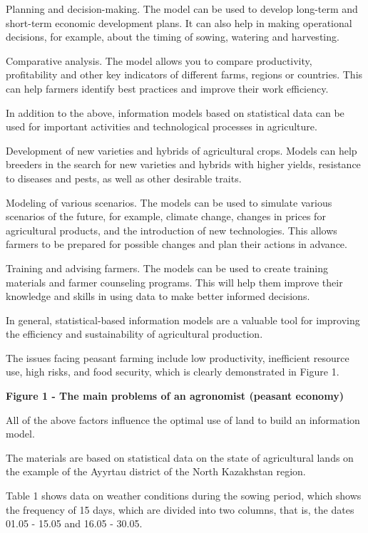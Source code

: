 Planning and decision-making. The model can be used to develop long-term
and short-term economic development plans. It can also help in making
operational decisions, for example, about the timing of sowing, watering
and harvesting.

Comparative analysis. The model allows you to compare productivity,
profitability and other key indicators of different farms, regions or
countries. This can help farmers identify best practices and improve
their work efficiency.

In addition to the above, information models based on statistical data
can be used for important activities and technological processes in
agriculture.

Development of new varieties and hybrids of agricultural crops. Models
can help breeders in the search for new varieties and hybrids with
higher yields, resistance to diseases and pests, as well as other
desirable traits.

Modeling of various scenarios. The models can be used to simulate
various scenarios of the future, for example, climate change, changes in
prices for agricultural products, and the introduction of new
technologies. This allows farmers to be prepared for possible changes
and plan their actions in advance.

Training and advising farmers. The models can be used to create training
materials and farmer counseling programs. This will help them improve
their knowledge and skills in using data to make better informed
decisions.

In general, statistical-based information models are a valuable tool for
improving the efficiency and sustainability of agricultural production.

The issues facing peasant farming include low productivity, inefficient
resource use, high risks, and food security, which is clearly
demonstrated in Figure 1.

\textbf{Figure 1 - The main problems of an agronomist (peasant economy)}

All of the above factors influence the optimal use of land to build an
information model.

The materials are based on statistical data on the state of agricultural
lands on the example of the Ayyrtau district of the North Kazakhstan
region.

Table 1 shows data on weather conditions during the sowing period, which
shows the frequency of 15 days, which are divided into two columns, that
is, the dates 01.05 - 15.05 and 16.05 - 30.05.

